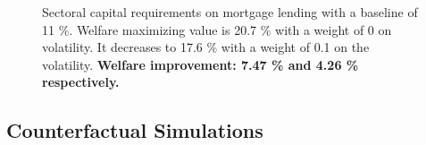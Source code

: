 \documentclass[12pt]{article}
\numberwithin{equation}{section}
\begin{document}
\begin{figure}[H]
\centering
\caption{Sectoral capital requirements on mortgage lending with a baseline of 11 \%. Welfare maximizing value is 20.7 \% with a weight of 0 on volatility. It decreases to 17.6 \% with a weight of 0.1 on the volatility.
\label{optimalPrud_fig}
\textbf{Welfare improvement: 7.47 \% and 4.26 \% respectively.} } 
\end{figure}




\newpage

\subsection{Counterfactual Simulations}
\end{document}
